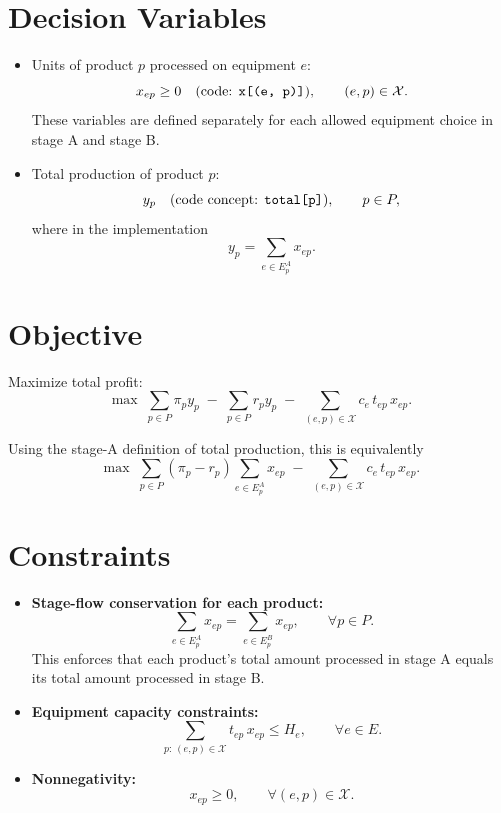 \section*{Decision Variables}

\begin{itemize}
    \item Units of product $p$ processed on equipment $e$:
    \[
    x_{ep} \ge 0 \quad \text{(code: \texttt{x[(e, p)]})}, \qquad (e,p)\in\mathcal{X}.
    \]
    These variables are defined separately for each allowed equipment choice in stage A and stage B.
    \item Total production of product $p$:
    \[
    y_p \quad \text{(code concept: \texttt{total[p]})}, \qquad p\in P,
    \]
    where in the implementation
    \[
    y_p = \sum_{e\in E^A_p} x_{ep}.
    \]
\end{itemize}

\section*{Objective}

Maximize total profit:
\[
\max \;
\sum_{p\in P} \pi_p y_p
\;-\;
\sum_{p\in P} r_p y_p
\;-\;
\sum_{(e,p)\in\mathcal{X}} c_e\, t_{ep}\, x_{ep}.
\]

Using the stage-A definition of total production, this is equivalently
\[
\max \;
\sum_{p\in P} (\pi_p-r_p)\sum_{e\in E^A_p} x_{ep}
\;-\;
\sum_{(e,p)\in\mathcal{X}} c_e\, t_{ep}\, x_{ep}.
\]

\section*{Constraints}

\begin{itemize}
    \item \textbf{Stage-flow conservation for each product:}
    \[
    \sum_{e\in E^A_p} x_{ep}
    =
    \sum_{e\in E^B_p} x_{ep},
    \qquad \forall p\in P.
    \]
    This enforces that each product's total amount processed in stage A equals its total amount processed in stage B.

    \item \textbf{Equipment capacity constraints:}
    \[
    \sum_{p:\,(e,p)\in\mathcal{X}} t_{ep}\,x_{ep}
    \le
    H_e,
    \qquad \forall e\in E.
    \]

    \item \textbf{Nonnegativity:}
    \[
    x_{ep}\ge 0,
    \qquad \forall (e,p)\in\mathcal{X}.
    \]
\end{itemize}

